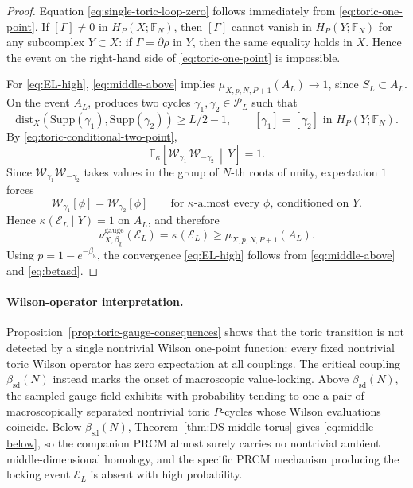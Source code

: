 \documentclass[dvipsnames,a4paper]{article}
\numberwithin{equation}{section}
\theoremstyle{definition}
\theoremstyle{remark}
\newcommand{\Supp}{\mathrm{Supp}}
\begin{document}
\begin{proof}
	Equation \eqref{eq:single-toric-loop-zero} follows immediately from
	\eqref{eq:toric-one-point}. If \([\Gamma]\neq 0\) in \(H_P(X;\mathbb F_N)\),
	then \([\Gamma]\) cannot vanish in \(H_P(Y;\mathbb F_N)\) for any subcomplex
	\(Y\subset X\): if \(\Gamma=\partial \rho\) in \(Y\), then the same equality
	holds in \(X\). Hence the event on the right-hand side of
	\eqref{eq:toric-one-point} is impossible.
	
	For \eqref{eq:EL-high}, \eqref{eq:middle-above} implies
	\(\mu_{X,p,N,P+1}(A_L)\to 1\), since \(S_L\subset A_L\). On the event \(A_L\),
	\cite[Prop.~36]{DuncanSchweinhartTopological} produces two cycles
	\(\gamma_1,\gamma_2\in\mathscr P_L\) such that
	\begin{equation}
		\mathrm{dist}_X(\Supp(\gamma_1),\Supp(\gamma_2))\ge L/2-1,
		\qquad
		[\gamma_1]=[\gamma_2]\text{ in }H_P(Y;\mathbb F_N).
		\label{eq:toric-pair-from-giant-cycle}
	\end{equation}
	By \eqref{eq:toric-conditional-two-point},
	\begin{equation}
		\mathbb E_{\kappa}\!\left[
		\mathcal W_{\gamma_1}\,\mathcal W_{-\gamma_2}
		\,\middle|\, Y
		\right]
		=1.
	\end{equation}
	Since \(\mathcal W_{\gamma_1}\mathcal W_{-\gamma_2}\) takes values in the
	group of \(N\)-th roots of unity, expectation \(1\) forces
	\begin{equation}
		\mathcal W_{\gamma_1}[\phi]=\mathcal W_{\gamma_2}[\phi]
		\qquad
		\text{for \(\kappa\)-almost every \(\phi\), conditioned on }Y.
		\label{eq:toric-conditional-locking}
	\end{equation}
	Hence \(\kappa(\mathcal E_L\mid Y)=1\) on \(A_L\), and therefore
	\begin{equation}
		\nu^{\mathrm{gauge}}_{X,\beta_{\mathrm g}}(\mathcal E_L)
		=
		\kappa(\mathcal E_L)
		\ge
		\mu_{X,p,N,P+1}(A_L).
		\label{eq:EL-lower-bound}
	\end{equation}
	Using \(p=1-e^{-\beta_{\mathrm g}}\), the convergence
	\eqref{eq:EL-high} follows from \eqref{eq:middle-above} and
	\eqref{eq:betasd}.
\end{proof}

\paragraph{Wilson-operator interpretation.}
Proposition~\ref{prop:toric-gauge-consequences} shows that the toric transition
is not detected by a single nontrivial Wilson one-point function: every fixed
nontrivial toric Wilson operator has zero expectation at all couplings. The
critical coupling \(\beta_{\mathrm{sd}}(N)\) instead marks the onset of
macroscopic value-locking. Above \(\beta_{\mathrm{sd}}(N)\), the sampled gauge
field exhibits with probability tending to one a pair of macroscopically
separated nontrivial toric \(P\)-cycles whose Wilson evaluations coincide.
Below \(\beta_{\mathrm{sd}}(N)\), Theorem~\ref{thm:DS-middle-torus} gives
\eqref{eq:middle-below}, so the companion PRCM almost surely carries no
nontrivial ambient middle-dimensional homology, and the specific PRCM
mechanism producing the locking event \(\mathcal E_L\) is absent with high
probability.
\end{document}

